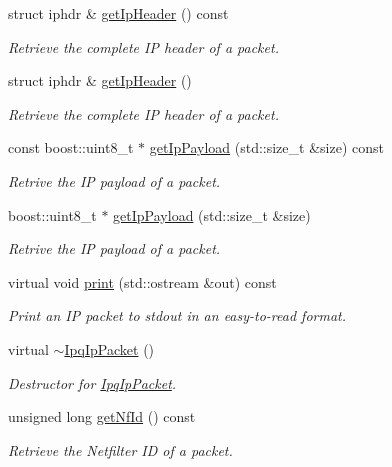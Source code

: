 \begin{DoxyCompactItemize}
struct iphdr \& \hyperlink{classIPQ_1_1IpqIpPacket_abf46954191d96b4e2fe136f79ba6c8ac}{get\-Ip\-Header} () const 
\begin{DoxyCompactList}\small\item\em \-Retrieve the complete \-I\-P header of a packet. \end{DoxyCompactList}\item 
struct iphdr \& \hyperlink{classIPQ_1_1IpqIpPacket_aa6e89b7927e748d00b9562e85192b492}{get\-Ip\-Header} ()
\begin{DoxyCompactList}\small\item\em \-Retrieve the complete \-I\-P header of a packet. \end{DoxyCompactList}\item 
const boost\-::uint8\-\_\-t $\ast$ \hyperlink{classIPQ_1_1IpqIpPacket_adc020ff0aceeba0577e4bb90dcc6f86f}{get\-Ip\-Payload} (std\-::size\-\_\-t \&size) const 
\begin{DoxyCompactList}\small\item\em \-Retrive the \-I\-P payload of a packet. \end{DoxyCompactList}\item 
boost\-::uint8\-\_\-t $\ast$ \hyperlink{classIPQ_1_1IpqIpPacket_a47343dd1a4fc52c8fda6de4aa313a688}{get\-Ip\-Payload} (std\-::size\-\_\-t \&size)
\begin{DoxyCompactList}\small\item\em \-Retrive the \-I\-P payload of a packet. \end{DoxyCompactList}\item 
virtual void \hyperlink{classIPQ_1_1IpqIpPacket_a5ddc175ec8c4bc8c7bab3baee12909f0}{print} (std\-::ostream \&out) const 
\begin{DoxyCompactList}\small\item\em \-Print an \-I\-P packet to stdout in an easy-\/to-\/read format. \end{DoxyCompactList}\item 
virtual \hyperlink{classIPQ_1_1IpqIpPacket_a13e93bcb4fa2dc3fdc4ec122c1666574}{$\sim$\-Ipq\-Ip\-Packet} ()
\begin{DoxyCompactList}\small\item\em \-Destructor for \hyperlink{classIPQ_1_1IpqIpPacket}{\-Ipq\-Ip\-Packet}. \end{DoxyCompactList}\item 
unsigned long \hyperlink{classIPQ_1_1IpqPacket_ac3cbbe2b61e12730ffe231fa19c96e5a}{get\-Nf\-Id} () const 
\begin{DoxyCompactList}\small\item\em \-Retrieve the \-Netfilter \-I\-D of a packet. \end{DoxyCompactList}\item 

\end{DoxyCompactItemize}
